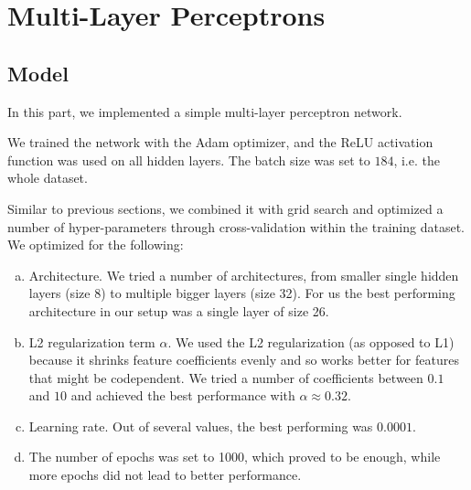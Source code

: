 \section{Multi-Layer Perceptrons}

\subsection{Model}

In this part, we implemented a simple multi-layer perceptron network.

We trained the network with the Adam optimizer, and the ReLU activation function was used on all hidden layers.
The batch size was set to $184$, i.e. the whole dataset.

Similar to previous sections, we combined it with grid search and optimized a number of hyper-parameters through cross-validation within the training dataset. We optimized for the following:

\begin{enumerate}[a.]
    \item Architecture. We tried a number of architectures, from smaller single hidden layers (size 8) to multiple bigger layers (size 32). For us the best performing architecture in our setup was a single layer of size 26.
    \item L2 regularization term $\alpha$. We used the L2 regularization (as opposed to L1) because it shrinks feature coefficients evenly and so works better for features that might be codependent. We tried a number of coefficients between $0.1$ and $10$ and achieved the best performance with $\alpha \approx 0.32$.
    \item Learning rate. Out of several values, the best performing was $0.0001$.
    \item The number of epochs was set to 1000, which proved to be enough, while more epochs did not lead to better performance.
\end{enumerate}

